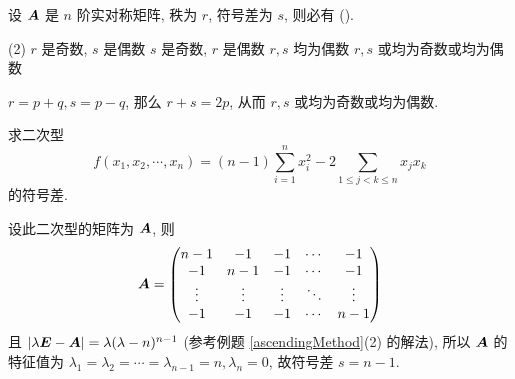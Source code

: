 \begin{example}
    设 $\vb*{A}$ 是 $n$ 阶实对称矩阵, 秩为 $r$, 符号差为 $s$, 则必有 (\quad).
    \begin{tasks}(2)
        \task $r$ 是奇数, $s$ 是偶数
        \task $s$ 是奇数, $r$ 是偶数
        \task $r,s$ 均为偶数
        \task $r,s$ 或均为奇数或均为偶数
    \end{tasks}
\end{example}
\begin{solution}
    $r=p+q,s=p-q$, 那么 $r+s=2p$, 从而 $r,s$ 或均为奇数或均为偶数.
\end{solution}

\begin{example}
    求二次型 $$\displaystyle f(x_1,x_2,\cdots,x_n)=(n-1)\sum_{i=1}^{n}x_i^2-2\sum_{1\leqslant j<k\leqslant n}x_jx_k$$
    的符号差.
\end{example}
\begin{solution}
    设此二次型的矩阵为 $\vb*{A}$, 则 $$\vb*{A}=\mqty(n-1&-1&-1&\cdots&-1\\-1&n-1&-1&\cdots&-1\\\vdots& \vdots& \vdots& \ddots & \vdots\\-1&-1&-1&\cdots&n-1)$$
    且 $|\lambda\vb*{E}-\vb*{A}|=\lambda(\lambda-n)^{n-1}$ (参考例题 \ref{ascendingMethod}(2) 的解法), 所以 $\vb*{A}$ 的特征值为 $\lambda_1=\lambda_2=\cdots=\lambda_{n-1}=n,\lambda_n=0$, 故符号差 $s=n-1.$
\end{solution}

